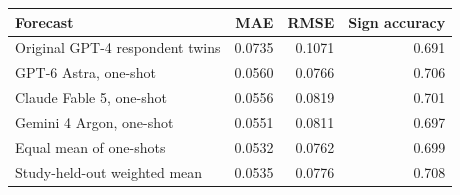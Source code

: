 \begin{tabular}{lrrr}
\toprule
Forecast & MAE & RMSE & Sign accuracy \\
\midrule
Original GPT-4 respondent twins & 0.0735 & 0.1071 & 0.691 \\
GPT-6 Astra, one-shot & 0.0560 & 0.0766 & 0.706 \\
Claude Fable 5, one-shot & 0.0556 & 0.0819 & 0.701 \\
Gemini 4 Argon, one-shot & 0.0551 & 0.0811 & 0.697 \\
Equal mean of one-shots & 0.0532 & 0.0762 & 0.699 \\
Study-held-out weighted mean & 0.0535 & 0.0776 & 0.708 \\
\bottomrule
\end{tabular}
